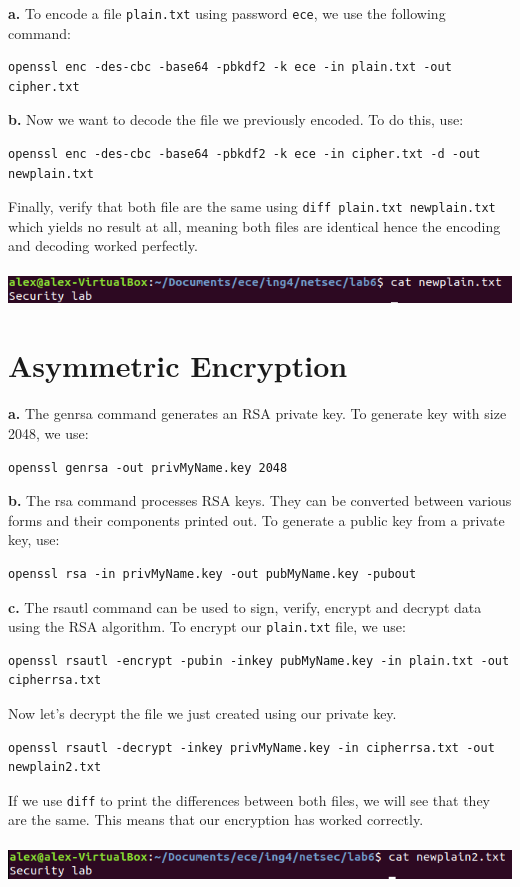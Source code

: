 \documentclass[12pt]{extarticle}
\begin{document}
\textbf{a.} To encode a file \texttt{plain.txt} using password \texttt{ece}, we use the following command:
\begin{verbatim}
openssl enc -des-cbc -base64 -pbkdf2 -k ece -in plain.txt -out cipher.txt
\end{verbatim}

\textbf{b.} Now we want to decode the file we previously encoded. To do this, use:
\begin{verbatim}
openssl enc -des-cbc -base64 -pbkdf2 -k ece -in cipher.txt -d -out newplain.txt
\end{verbatim}
Finally, verify that both file are the same using \texttt{diff plain.txt newplain.txt} which yields no result at all, meaning both files are identical hence the encoding and decoding worked perfectly.\\\\
\includegraphics[scale=0.6]{resources/1.png}

\section{Asymmetric Encryption}
\textbf{a.} The genrsa command generates an RSA private key. To generate key with size 2048, we use:
\begin{verbatim}
openssl genrsa -out privMyName.key 2048
\end{verbatim}

\textbf{b.} The rsa command processes RSA keys. They can be converted between various forms and their components printed out. To generate a public key from a private key, use:
\begin{verbatim}
openssl rsa -in privMyName.key -out pubMyName.key -pubout 
\end{verbatim}

\textbf{c.} The rsautl command can be used to sign, verify, encrypt and decrypt data using the RSA algorithm. To encrypt our \texttt{plain.txt} file, we use:
\begin{verbatim}
openssl rsautl -encrypt -pubin -inkey pubMyName.key -in plain.txt -out cipherrsa.txt
\end{verbatim}
Now let's decrypt the file we just created using our private key.
\begin{verbatim}
openssl rsautl -decrypt -inkey privMyName.key -in cipherrsa.txt -out newplain2.txt
\end{verbatim}
If we use \texttt{diff} to print the differences between both files, we will see that they are the same. This means that our encryption has worked correctly.\\\\
\includegraphics[scale=0.6]{resources/2.png}
\end{document}
